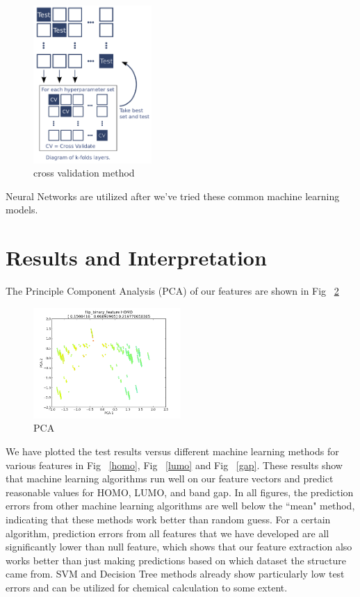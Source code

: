 \documentclass[12pt, oneside]{article}   	%
\begin{document}
\begin{figure}[H]
\begin{center}
\includegraphics [width=0.4\textwidth]{crossvalidation.png}
\caption{cross validation method}\label{crossvalidation}
\end{center}
\end{figure}

Neural Networks are utilized after we've tried these common machine learning models. 



\section{Results and Interpretation}
\noindent The Principle Component Analysis (PCA) of our features are shown in Fig ~\ref{flippca} 

\begin{figure}[H]
\begin{center}
\includegraphics [width=0.5\textwidth]{flip_binary_feature_HOMO.png}
\caption{PCA}\label{flippca}
\end{center}
\end{figure}

We have plotted the test results versus different machine learning methods for various features in Fig ~\ref{homo}, Fig ~\ref{lumo} and Fig ~\ref{gap}. These results show that machine learning algorithms run well on our feature vectors and predict reasonable values for HOMO, LUMO, and band gap. In all figures, the prediction errors from other machine learning algorithms are well below the ``mean" method, indicating that these methods work better than random guess. For a certain algorithm, prediction errors from all features that we have developed are all significantly lower than null feature, which shows that our feature extraction also works better than just making predictions based on which dataset the structure came from. SVM and Decision Tree methods already show particularly low test errors and can be utilized for chemical calculation to some extent.
\end{document}
